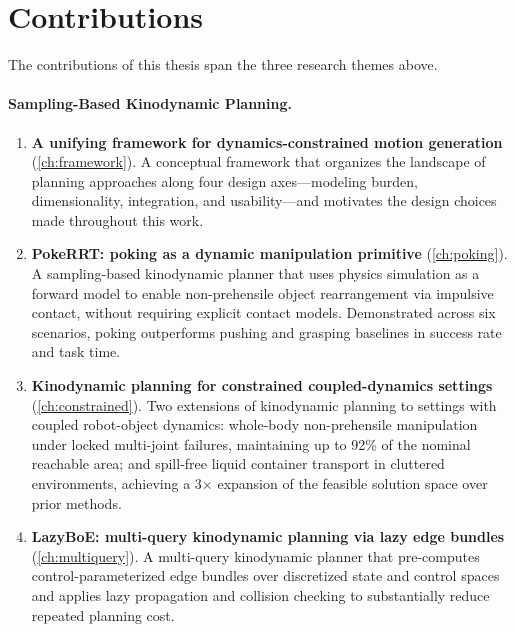 \section{Contributions}
\label{sec:intro:contributions}

The contributions of this thesis span the three research themes above.

\paragraph{Sampling-Based Kinodynamic Planning.}
\begin{enumerate}
  \item \textbf{A unifying framework for dynamics-constrained motion generation} (\cref{ch:framework}).
        A conceptual framework that organizes the landscape of planning approaches along four design axes---modeling burden, dimensionality, integration, and usability---and motivates the design choices made throughout this work.

  \item \textbf{PokeRRT: poking as a dynamic manipulation primitive} (\cref{ch:poking}).
        A sampling-based kinodynamic planner that uses physics simulation as a forward model to enable non-prehensile object rearrangement via impulsive contact, without requiring explicit contact models.
        Demonstrated across six scenarios, poking outperforms pushing and grasping baselines in success rate and task time.

  \item \textbf{Kinodynamic planning for constrained coupled-dynamics settings} (\cref{ch:constrained}).
        Two extensions of kinodynamic planning to settings with coupled robot-object dynamics: whole-body non-prehensile manipulation under locked multi-joint failures, maintaining up to 92\% of the nominal reachable area; and spill-free liquid container transport in cluttered environments, achieving a 3$\times$ expansion of the feasible solution space over prior methods.

  \item \textbf{LazyBoE: multi-query kinodynamic planning via lazy edge bundles} (\cref{ch:multiquery}).
        A multi-query kinodynamic planner that pre-computes control-parameterized edge bundles over discretized state and control spaces and applies lazy propagation and collision checking to substantially reduce repeated planning cost.
\end{enumerate}

